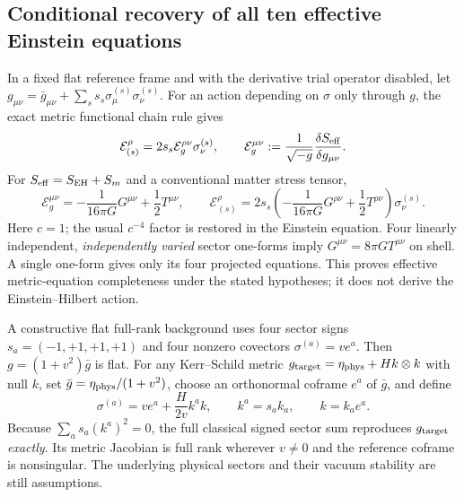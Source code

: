 \documentclass[11pt,a4paper]{article}
\begin{document}
\subsection{Conditional recovery of all ten effective Einstein equations}
In a fixed flat reference frame and with the derivative trial operator disabled,
let $g_{\mu\nu}=\bar g_{\mu\nu}+\sum_s s_s\sigma^{(s)}_\mu\sigma^{(s)}_\nu$.
For an action depending on $\sigma$ only through $g$, the exact metric functional
chain rule gives
\begin{equation}\label{eq:qgd052-chain}
 \mathcal E_{(s)}^\rho=2s_s\mathcal E_g^{\rho\nu}\sigma^{(s)}_\nu,
 \qquad \mathcal E_g^{\mu\nu}:=\frac1{\sqrt{-g}}\frac{\delta S_{\rm eff}}{\delta g_{\mu\nu}}.
\end{equation}
For $S_{\rm eff}=S_{\rm EH}+S_m$ and a conventional matter stress tensor,
\begin{equation}\label{eq:qgd052-EFE-residual}
 \mathcal E_g^{\mu\nu}= -\frac1{16\pi G}G^{\mu\nu}+\frac12 T^{\mu\nu},
 \qquad
 \mathcal E_{(s)}^\rho=2s_s\left(-\frac1{16\pi G}G^{\rho\nu}
 +\frac12 T^{\rho\nu}\right)\sigma_\nu^{(s)}.
\end{equation}
Here $c=1$; the usual $c^{-4}$ factor is restored in the Einstein equation.
Four linearly independent, \emph{independently varied} sector one-forms imply
$G^{\mu\nu}=8\pi G T^{\mu\nu}$ on shell.  A single one-form gives only its
four projected equations.  This proves effective metric-equation completeness
under the stated hypotheses; it does not derive the Einstein--Hilbert action.

A constructive flat full-rank background uses four sector signs
$s_a=(-1,+1,+1,+1)$ and four nonzero covectors $\sigma^{(a)}=v e^a$.
Then $g=(1+v^2)\bar g$ is flat.  For any Kerr--Schild metric
$g_{\rm target}=\eta_{\rm phys}+Hk\otimes k$ with null $k$, set
$\bar g=\eta_{\rm phys}/(1+v^2)$, choose an orthonormal coframe $e^a$
of $\bar g$, and define
\begin{equation}\label{eq:qgd052-ks-sectors}
 \sigma^{(a)}=v e^a+\frac{H}{2v}k^a k,
 \qquad k^a=s_a k_a,\qquad k=k_a e^a.
\end{equation}
Because $\sum_a s_a(k^a)^2=0$, the full classical signed sector sum
reproduces $g_{\rm target}$ \emph{exactly}.  Its metric Jacobian is
full rank wherever $v\ne0$ and the reference coframe is nonsingular.
The underlying physical sectors and their vacuum stability are still assumptions.
\end{document}
